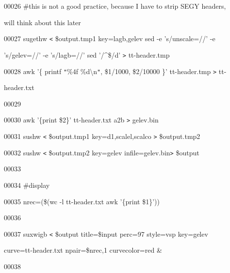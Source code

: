\documentclass{article}
\begin{document}
\vspace{4pt}
00026 \#this is not a good practice, because I have to strip SEGY headers, 

\vspace{4pt}
will think about this later\label{l00027}

\vspace{4pt}
00027 sugethw \texttt{<} \$output.tmp1 key=lagb,gelev \textbar{} sed -e 's/unscale=//' 
-e 

\vspace{4pt}
's/gelev=//' -e 's/lagb=//'\textbar{} sed '/\textasciicircum{}\$/d' \texttt{>} 
tt-header.tmp\label{l00028}

\vspace{4pt}
00028 awk '\{ printf \texttt{"}\%4f \%d\textbackslash{}n\texttt{"}, \$1/1000, \$2/10000 
\}' tt-header.tmp \texttt{>} tt-

\vspace{4pt}
header.txt\label{l00029}

\vspace{4pt}
00029 \label{l00030}

\vspace{4pt}
00030 awk '\{print \$2\}' tt-header.txt \textbar{} a2b \texttt{>} gelev.bin\label{l00031}

\vspace{4pt}
00031 sushw \texttt{<} \$output.tmp1 key=d1,scalel,scalco \texttt{>} \$output.tmp2\label{l00032}

\vspace{4pt}
00032 sushw \texttt{<} \$output.tmp2 key=gelev infile=gelev.bin\texttt{>} \$output\label{l00033}

\vspace{4pt}
00033 \label{l00034}

\vspace{4pt}
00034 \#display\label{l00035}

\vspace{4pt}
00035 nrec=(\$(wc -l tt-header.txt \textbar{} awk '\{print \$1\}'))\label{l00036}

\vspace{4pt}
00036 \label{l00037}

\vspace{4pt}
00037 suxwigb \texttt{<} \$output title=\$input perc=97 style=vsp key=gelev 

\vspace{4pt}
curve=tt-header.txt npair=\$nrec,1 curvecolor=red \&\label{l00038}

\vspace{4pt}
00038 \label{l00039}
\end{document}
